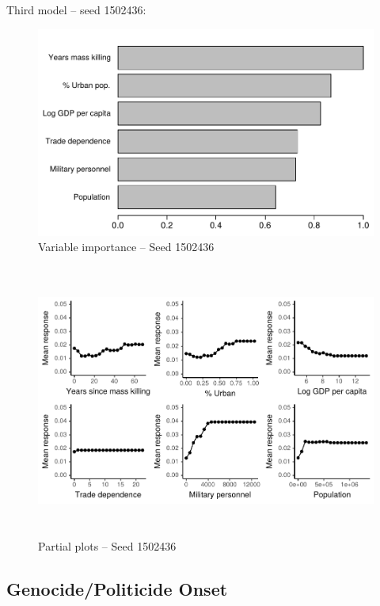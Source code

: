 \newpage

Third model -- seed 1502436: 

\begin{figure}[H]
    \centering
    \includegraphics{images/drf-mk3.pdf}
    \caption{Variable importance -- Seed 1502436}
    \label{fig:my_label}
\end{figure}

\begin{figure}[H]
    \centering
    \includegraphics[width=\textwidth, height=9cm]{images/drfdpp3a.pdf}
    \caption{Partial plots -- Seed 1502436}
    \label{fig:my_label}
\end{figure}

\newpage

\subsection{Genocide/Politicide Onset}
\label{sec:mk-other-variable}

